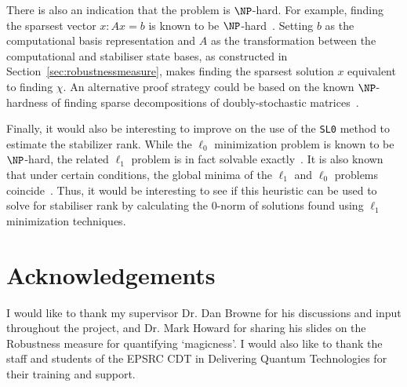 \documentclass{standalone}
\begin{document}
There is also an indication that the problem is $\NP$-hard. For example, finding the sparsest vector $x:Ax=b$ is known to be $\NP$-hard~\cite{ge2011note}. Setting $b$ as the computational basis representation and $A$ as the transformation between the computational and stabiliser state bases, as constructed in Section~\ref{sec:robustnessmeasure}, makes finding the sparsest solution $x$ equivalent to finding $\chi$. An alternative proof strategy could be based on the known $\NP$-hardness of finding sparse decompositions of doubly-stochastic matrices~\cite{Dufosse2016}.
\par
Finally, it would also be interesting to improve on the use of the \texttt{SL0} method to estimate the stabilizer rank. While the $\ell_{0}$ minimization problem is known to be $\NP$-hard, the related $\ell_{1}$ problem is in fact solvable exactly~\cite{Howard2016}. It is also known that under certain conditions, the global minima of the $\ell_{1}$ and $\ell_{0}$ problems coincide~\cite{Sawada2005}. Thus, it would be interesting to see if this heuristic can be used to solve for stabiliser rank by calculating the $0$-norm of solutions found using $\ell_{1}$ minimization techniques. 

\section*{Acknowledgements}
I would like to thank my supervisor Dr. Dan Browne for his discussions and input throughout the project, and Dr. Mark Howard for sharing his slides on the Robustness measure for quantifying `magicness'. I would also like to thank the staff and students of the EPSRC CDT in Delivering Quantum Technologies for their training and support. 

\ifstandalone 

\fi
\end{document}
